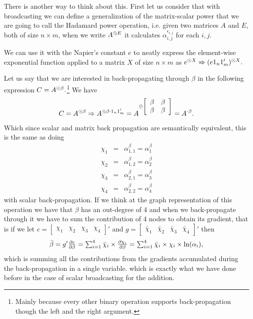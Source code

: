 \documentclass{sapthesis}
\begin{document}
There is another way to think about this. First let us consider that with
broadcasting we can define a generalization of the matrix-scalar power that we
are going to call the Hadamard power operation, i.e. given two matrices \(A\)
and \(E\), both of size \(n \times m\), when we write \(A^{{\odot}E}\) it
calculates \(\alpha_{i,j}^{\epsilon_{i,j}}\) for each \(i,j.\)

We can use it with the Napier's constant \(e\) to neatly express the
element-wise exponential function applied to a matrix \(X\) of size \(n \times
m\) as \(e^{{\odot}X} \Rightarrow (e 1_n 1_m')^{{\odot}X}.\)

Let us say that we are interested in back-propagating through \(\beta\) in
the following expression \(C = A^{{\odot}\beta}.\)\footnote{Mainly because
every other binary operation supports back-propagation though the left and the
right argument.} We have \[
C = A^{{\odot}\beta} \Rightarrow A^{{\odot}\beta \cdot 1_n 1_m'} 
= A^{{\odot}\left[\begin{array}{cc}\beta&\beta\\\beta&\beta\end{array}\right]}
= A^{{\cdot}\beta}.
\]

Which since scalar and matrix back propagation are semantically equivalent, this
is the same as doing
\begin{eqnarray*}
    \chi_1 &=& \alpha_{1,1}^\beta = \alpha_1^\beta \\
    \chi_2 &=& \alpha_{1,2}^\beta = \alpha_2^\beta \\
    \chi_3 &=& \alpha_{2,1}^\beta = \alpha_3^\beta \\
    \chi_4 &=& \alpha_{2,2}^\beta = \alpha_4^\beta
\end{eqnarray*}
with scalar back-propagation. If we think at the graph representation of this
operation we have that \(\beta\) has an out-degree of 4 and when we
back-propagate through it we have to sum the contribution of 4 nodes to obtain
its gradient, that is if we let \(c = [\begin{array}{cccc}\chi_1& \chi_2&
\chi_3& \chi_4 \end{array}]'\) and \(g =
[\begin{array}{cccc}\bar\chi_1& \bar\chi_2& \bar\chi_3& \bar\chi_4
\end{array}]'\) then \[
\bar\beta
    = g' \textstyle\frac{\partial c}{\partial\beta}
    = \sum_{i=1}^{4} \bar\chi_i \times \textstyle\frac{\partial\chi_i}{\partial\beta}
    = \sum_{i=1}^{4} \bar\chi_i \times \chi_i \times \ln(\alpha_i),
\] which is summing all the contributions from the gradients accumulated during
the back-propagation in a single variable. which is exactly what we have done
before in the case of scalar broadcasting for the addition.
\end{document}
